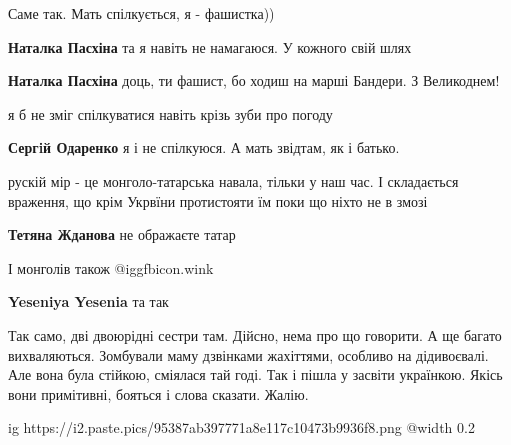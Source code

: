 
 
 
 
 
\zzSecCmt

\begin{itemize} %
Саме так. Мать спілкується, я - фашистка))

\begin{itemize} %
\textbf{Наталка Пасхіна} та я навіть не намагаюся. У кожного свій шлях

\textbf{Наталка Пасхіна} доць, ти фашист, бо ходиш на марші Бандери. З Великоднем!

я б не зміг спілкуватися навіть крізь зуби про погоду

\textbf{Сергiй Одаренко} я і не спілкуюся. А мать звідтам, як і батько.
\end{itemize} %


рускій мір - це монголо-татарська навала, тільки у наш час. І складається
враження, що крім Укрвїни протистояти їм поки що ніхто не в змозі

\begin{itemize} %
\textbf{Тетяна Жданова} не ображаєте татар

І монголів також  @igg{fbicon.wink} 

\textbf{Yeseniya Yesenia} та так
\end{itemize} %


Так само, дві двоюрідні сестри там. Дійсно, нема про що говорити. А ще багато
вихваляються. Зомбували маму дзвінками жахіттями, особливо на дідивоєвалі. Але
вона була стійкою, сміялася тай годі. Так і пішла у засвіти українкою. Якісь
вони примітивні, бояться і слова сказати. Жалію.


\ifcmt
  ig https://i2.paste.pics/95387ab397771a8e117c10473b9936f8.png
  @width 0.2
\fi



\end{itemize}
